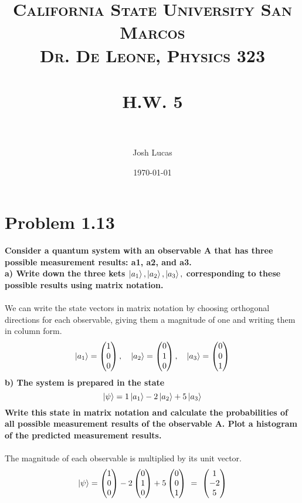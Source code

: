\documentclass[paper=a4, fontsize=11pt]{scrartcl} %
\title{	
\normalfont \normalsize 
\textsc{California State University San Marcos \\ Dr. De Leone, Physics 323} \\ [25pt] %
\horrule{0.5pt} \\[0.4cm] %
\huge H.W. 5 \\ %
\horrule{2pt} \\[0.5cm] %
}
\author{Josh Lucas} %
\date{\normalsize\today} %
\numberwithin{equation}{section} %
\numberwithin{figure}{section} %
\numberwithin{table}{section} %
\begin{document}
\maketitle %


\section*{Problem 1.13}
\textbf{Consider a quantum system with an observable A that has three possible measurement
results: a1, a2, and a3.}\\
\textbf{a) Write down the three kets $\ket{a_1}, \ket{a_2}, \ket{a_3},$ corresponding to these possible results
using matrix notation.}\\
\\
We can write the state vectors in matrix notation by choosing  orthogonal directions for each observable, giving them a magnitude of one and writing them in column form.
$$
\ket{a_1} =
\begin{pmatrix}
1\\ 0\\0
\end{pmatrix},
\quad
\ket{a_2} =
\begin{pmatrix}
0\\ 1\\0
\end{pmatrix},
\quad
\ket{a_3} = 
\begin{pmatrix}
0\\0\\1
\end{pmatrix}
$$
\textbf{b) The system is prepared in the state}\\
$$\ket{\psi} = 1\ket{a_1} -2\ket{a_2} +5\ket{a_3}$$
\textbf{Write this state in matrix notation and calculate the probabilities of all possible measurement
results of the observable A. Plot a histogram of the predicted measurement results.}\\
\\
The magnitude of each observable is multiplied by its unit vector.
\begin{equation*}
\ket{\psi} = \begin{pmatrix}
1\\0\\0
\end{pmatrix} -
2 \begin{pmatrix}
0\\1\\0
\end{pmatrix} +
5 \begin{pmatrix}
0\\0\\1
\end{pmatrix}\ =\
\begin{pmatrix}
1\\-2\\5
\end{pmatrix}
\end{equation*}
\end{document}
